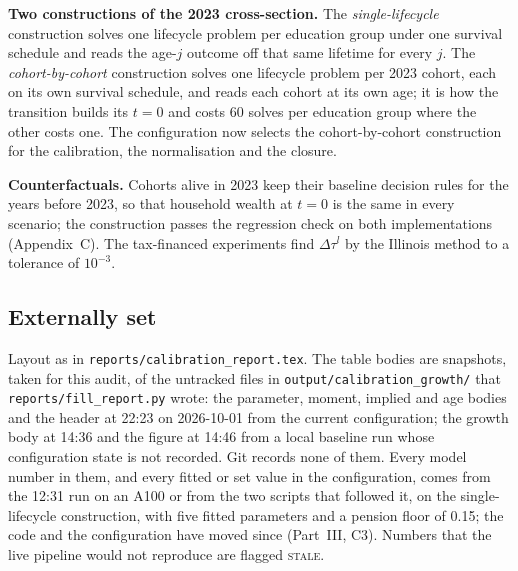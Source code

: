 \documentclass[11pt,a4paper]{article}
\newcommand{\tabdir}{audit_2026-10-01}
\newcommand{\code}[1]{\texttt{#1}}
\newcommand{\stale}{\textcolor{red!70!black}{\textsc{stale}}}
\begin{document}
\textbf{Two constructions of the 2023 cross-section.} The \emph{single-lifecycle} construction solves one lifecycle problem per education group under one survival schedule and reads the age-$j$ outcome off that same lifetime for every $j$. The \emph{cohort-by-cohort} construction solves one lifecycle problem per 2023 cohort, each on its own survival schedule, and reads each cohort at its own age; it is how the transition builds its $t = 0$ and costs 60 solves per education group where the other costs one. The configuration now selects the cohort-by-cohort construction for the calibration, the normalisation and the closure.

\textbf{Counterfactuals.} Cohorts alive in 2023 keep their baseline decision rules for the years before 2023, so that household wealth at $t = 0$ is the same in every scenario; the construction passes the regression check on both implementations (Appendix~C). The tax-financed experiments find $\Delta\tau^l$ by the Illinois method to a tolerance of $10^{-3}$.

\subsection{Externally set}

Layout as in \code{reports/calibration_report.tex}. The table bodies are snapshots, taken for this audit, of the untracked files in \code{output/calibration_growth/} that \code{reports/fill_report.py} wrote: the parameter, moment, implied and age bodies and the header at 22:23 on 2026-10-01 from the current configuration; the growth body at 14:36 and the figure at 14:46 from a local baseline run whose configuration state is not recorded. Git records none of them. Every model number in them, and every fitted or set value in the configuration, comes from the 12:31 run on an A100 or from the two scripts that followed it, on the single-lifecycle construction, with five fitted parameters and a pension floor of 0.15; the code and the configuration have moved since (Part~III, C3). Numbers that the live pipeline would not reproduce are flagged \stale.

\begin{table}[htbp]\centering\footnotesize
\caption{Parameters as printed by the report generator on 2026-10-01 22:23. Row flags: $n$ is the configuration's terminal rate $n_\infty = 0$, whereas the realised path starts at $n_0 = -0.0048$ (the header of the same run prints $-0.0048$); $K_g/Y$ is 0.703, the 2019 IMF stock rolled to 2023; $b_{\min} = 0.1671$ is the value in force now, while every fitted value in the next block was obtained at 0.15 (\stale\ for the block as a whole); the five SMM rows omit the sixth parameter $\rho^{ui}$ that the configuration lists; $A$ and $O/Y$ were set at the 12:31 $\theta$ on the single-lifecycle construction (\stale).}

\end{table}
\end{document}
